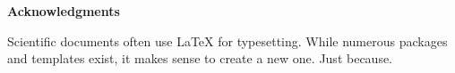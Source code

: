 
\cleardoublepage\thispagestyle{empty}

\textbf{\Large Acknowledgments}

Scientific documents often use \LaTeX{} for typesetting. While numerous
packages and templates exist, it makes sense to create a new one. Just
because.

